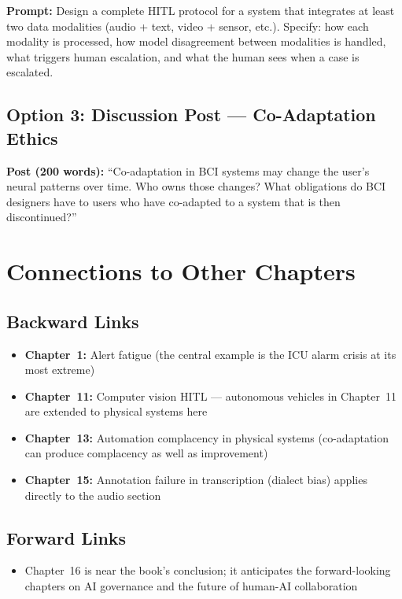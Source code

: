 \textbf{Prompt:} Design a complete HITL protocol for a system that integrates at least two data modalities (audio + text, video + sensor, etc.). Specify: how each modality is processed, how model disagreement between modalities is handled, what triggers human escalation, and what the human sees when a case is escalated.

\subsection{Option 3: Discussion Post --- Co-Adaptation Ethics}

\textbf{Post (200 words):} ``Co-adaptation in BCI systems may change the user's neural patterns over time. Who owns those changes? What obligations do BCI designers have to users who have co-adapted to a system that is then discontinued?''

\section{Connections to Other Chapters}

\subsection{Backward Links}
\begin{itemize}
    \item \textbf{Chapter~1:} Alert fatigue (the central example is the ICU alarm crisis at its most extreme)
    \item \textbf{Chapter~11:} Computer vision HITL --- autonomous vehicles in Chapter~11 are extended to physical systems here
    \item \textbf{Chapter~13:} Automation complacency in physical systems (co-adaptation can produce complacency as well as improvement)
    \item \textbf{Chapter~15:} Annotation failure in transcription (dialect bias) applies directly to the audio section
\end{itemize}

\subsection{Forward Links}
\begin{itemize}
    \item Chapter~16 is near the book's conclusion; it anticipates the forward-looking chapters on AI governance and the future of human-AI collaboration
\end{itemize}

